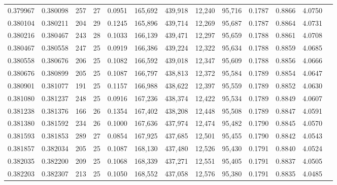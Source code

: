 \begin{tabular}{rrrrrrrrrrrrr}
0.379967 & 0.380098 & 257 &  27 &                                     0.0951 & 165,692 & 439,918 &  12,240 &  95,716 & 0.1787 & 0.8866 & 4.0750 \\
0.380104 & 0.380211 & 204 &  29 &                                     0.1245 & 165,896 & 439,714 &  12,269 &  95,687 & 0.1787 & 0.8864 & 4.0731 \\
0.380216 & 0.380467 & 243 &  28 &                                     0.1033 & 166,139 & 439,471 &  12,297 &  95,659 & 0.1788 & 0.8861 & 4.0708 \\
0.380467 & 0.380558 & 247 &  25 &                                     0.0919 & 166,386 & 439,224 &  12,322 &  95,634 & 0.1788 & 0.8859 & 4.0685 \\
0.380558 & 0.380676 & 206 &  25 &                                     0.1082 & 166,592 & 439,018 &  12,347 &  95,609 & 0.1788 & 0.8856 & 4.0666 \\
0.380676 & 0.380899 & 205 &  25 &                                     0.1087 & 166,797 & 438,813 &  12,372 &  95,584 & 0.1789 & 0.8854 & 4.0647 \\
0.380901 & 0.381077 & 191 &  25 &                                     0.1157 & 166,988 & 438,622 &  12,397 &  95,559 & 0.1789 & 0.8852 & 4.0630 \\
0.381080 & 0.381237 & 248 &  25 &                                     0.0916 & 167,236 & 438,374 &  12,422 &  95,534 & 0.1789 & 0.8849 & 4.0607 \\
0.381238 & 0.381376 & 166 &  26 &                                     0.1354 & 167,402 & 438,208 &  12,448 &  95,508 & 0.1789 & 0.8847 & 4.0591 \\
0.381380 & 0.381592 & 234 &  26 &                                     0.1000 & 167,636 & 437,974 &  12,474 &  95,482 & 0.1790 & 0.8845 & 4.0570 \\
0.381593 & 0.381853 & 289 &  27 &                                     0.0854 & 167,925 & 437,685 &  12,501 &  95,455 & 0.1790 & 0.8842 & 4.0543 \\
0.381857 & 0.382034 & 205 &  25 &                                     0.1087 & 168,130 & 437,480 &  12,526 &  95,430 & 0.1791 & 0.8840 & 4.0524 \\
0.382035 & 0.382200 & 209 &  25 &                                     0.1068 & 168,339 & 437,271 &  12,551 &  95,405 & 0.1791 & 0.8837 & 4.0505 \\
0.382203 & 0.382307 & 213 &  25 &                                     0.1050 & 168,552 & 437,058 &  12,576 &  95,380 & 0.1791 & 0.8835 & 4.0485 \\

\end{tabular}
